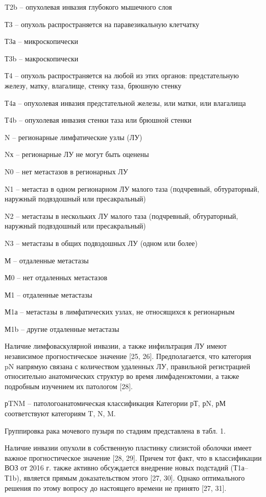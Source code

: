 T2b – опухолевая инвазия глубокого мышечного слоя

Т3 – опухоль распространяется на паравезикальную клетчатку

Т3а – микроскопически

Т3b – макроскопически

Т4 – опухоль распространяется на любой из этих органов: предстательную железу, матку, влагалище, стенку таза, брюшную стенку

Т4а – опухолевая инвазия предстательной железы, или матки, или влагалища

Т4b – опухолевая инвазия стенки таза или брюшной стенки

N – регионарные лимфатические узлы (ЛУ)

Nх – регионарные ЛУ не могут быть оценены

N0 – нет метастазов в регионарных ЛУ

N1 – метастаз в одном регионарном ЛУ малого таза (подчревный, обтураторный, наружный подвздошный или пресакральный)

N2 – метастазы в нескольких ЛУ малого таза (подчревный, обтураторный, наружный подвздошный или пресакральный)

N3 – метастазы в общих подвздошных ЛУ (одном или более)

М – отдаленные метастазы

М0 – нет отдаленных метастазов

М1 – отдаленные метастазы

М1а – метастазы в лимфатических узлах, не относящихся к регионарным

М1b – другие отдаленные метастазы

Наличие лимфоваскулярной инвазии, а также инфильтрация ЛУ имеют независимое прогностическое значение [25, 26]. Предполагается, что категория pN напрямую связана с количеством удаленных ЛУ, правильной регистрацией относительно анатомических структур во время лимфаденэктомии, а также подробным изучением их патологом [28].

рTNM – патологоанатомическая классификация Категории рТ, рN, рМ соответствуют категориям T, N, M.

Группировка рака мочевого пузыря по стадиям представлена в табл. 1.



Наличие инвазии опухоли в собственную пластинку слизистой оболочки имеет важное прогностическое значение [28, 29]. Причем тот факт, что в классификации ВОЗ от 2016 г. также активно обсуждается внедрение новых подстадий (Т1а–Т1b), является прямым доказательством этого [27, 30]. Однако оптимального решения по этому вопросу до настоящего времени не принято [27, 31].

